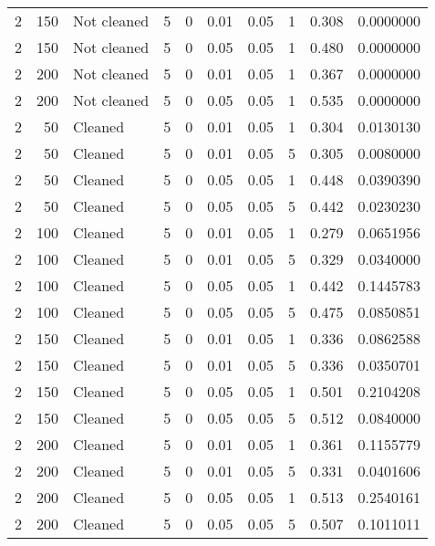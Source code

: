 \begin{table}
{{\begin{tabular}{rrlrrrrrrr}
\hspace{1em}2 & 150 & Not cleaned & 5 & 0 & 0.01 & 0.05 & 1 & 0.308 & 0.0000000\\
\hspace{1em}2 & 150 & Not cleaned & 5 & 0 & 0.05 & 0.05 & 1 & 0.480 & 0.0000000\\
\hspace{1em}2 & 200 & Not cleaned & 5 & 0 & 0.01 & 0.05 & 1 & 0.367 & 0.0000000\\
\hspace{1em}2 & 200 & Not cleaned & 5 & 0 & 0.05 & 0.05 & 1 & 0.535 & 0.0000000\\
\hspace{1em}2 & 50 & Cleaned & 5 & 0 & 0.01 & 0.05 & 1 & 0.304 & 0.0130130\\
\hspace{1em}2 & 50 & Cleaned & 5 & 0 & 0.01 & 0.05 & 5 & 0.305 & 0.0080000\\
\hspace{1em}2 & 50 & Cleaned & 5 & 0 & 0.05 & 0.05 & 1 & 0.448 & 0.0390390\\
\hspace{1em}2 & 50 & Cleaned & 5 & 0 & 0.05 & 0.05 & 5 & 0.442 & 0.0230230\\
\hspace{1em}2 & 100 & Cleaned & 5 & 0 & 0.01 & 0.05 & 1 & 0.279 & 0.0651956\\
\hspace{1em}2 & 100 & Cleaned & 5 & 0 & 0.01 & 0.05 & 5 & 0.329 & 0.0340000\\
\hspace{1em}2 & 100 & Cleaned & 5 & 0 & 0.05 & 0.05 & 1 & 0.442 & 0.1445783\\
\hspace{1em}2 & 100 & Cleaned & 5 & 0 & 0.05 & 0.05 & 5 & 0.475 & 0.0850851\\
\hspace{1em}2 & 150 & Cleaned & 5 & 0 & 0.01 & 0.05 & 1 & 0.336 & 0.0862588\\
\hspace{1em}2 & 150 & Cleaned & 5 & 0 & 0.01 & 0.05 & 5 & 0.336 & 0.0350701\\
\hspace{1em}2 & 150 & Cleaned & 5 & 0 & 0.05 & 0.05 & 1 & 0.501 & 0.2104208\\
\hspace{1em}2 & 150 & Cleaned & 5 & 0 & 0.05 & 0.05 & 5 & 0.512 & 0.0840000\\
\hspace{1em}2 & 200 & Cleaned & 5 & 0 & 0.01 & 0.05 & 1 & 0.361 & 0.1155779\\
\hspace{1em}2 & 200 & Cleaned & 5 & 0 & 0.01 & 0.05 & 5 & 0.331 & 0.0401606\\
\hspace{1em}2 & 200 & Cleaned & 5 & 0 & 0.05 & 0.05 & 1 & 0.513 & 0.2540161\\
\hspace{1em}2 & 200 & Cleaned & 5 & 0 & 0.05 & 0.05 & 5 & 0.507 & 0.1011011\\
\bottomrule
\end{tabular}
}}
 \end{table}
